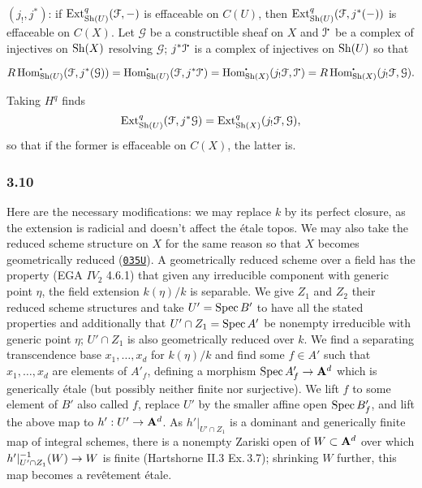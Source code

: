 \documentclass[deligne.tex]{subfiles}
\begin{document}
$(j_!,j^*)$: if $\operatorname{Ext}^q_{\operatorname{Sh}(U)}(\mathcal F,-)$ is effaceable on $C(U)$, 
then $\operatorname{Ext}^q_{\operatorname{Sh}(U)}(\mathcal F,j^*(-))$ is effaceable on $C(X)$.
Let $\mathcal G$ be a constructible sheaf on $X$ and $\mathcal I^\dotp$ be a 
complex of injectives on $\operatorname{Sh}(X)$ resolving $\mathcal G$;
$j^*\mathcal I^\dotp$ is a complex of injectives on $\operatorname{Sh}(U)$ so that
\begin{ceqn}\begin{equation*}
	R\Hom^\dotp_{\Sh(U)}(\mathcal F,j^*(\mathcal G))
	=\Hom^\dotp_{\Sh(U)}(\mathcal F,j^*\mathcal I^\dotp)
	=\Hom^\dotp_{\Sh(X)}(j_!\mathcal F,\mathcal I^\dotp)
	=R\Hom^\dotp_{\Sh(X)}(j_!\mathcal F,\mathcal G).
\end{equation*}\end{ceqn}
Taking $H^q$ finds
\begin{equation*}
	\operatorname{Ext}^q_{\operatorname{Sh}(U)}(\mathcal F,j^*\mathcal G)
	=\operatorname{Ext}^q_{\operatorname{Sh}(X)}(j_!\mathcal F,\mathcal G),
\end{equation*}
so that if the former is effaceable on $C(X)$, the latter is.



\subsubsection*{3.10} Here are the necessary modifications: we may replace
$k$ by its perfect closure, as the extension is radicial and doesn't affect
the étale topos. We may also take the reduced scheme structure on $X$ for 
the same reason so that $X$ becomes geometrically reduced
(\hyperref[https://stacks.math.columbia.edu/tag/035U]{\texttt{035U}}).
A geometrically reduced scheme over a field has the property
(EGA $IV_2$ 4.6.1) that given any irreducible component with generic point
$\eta$, the field extension $k(\eta)/k$ is separable.
We give $Z_1$ and $Z_2$ their reduced scheme structures and
take $U'=\operatorname{Spec} B'$ to have all the stated properties and additionally
that $U'\cap Z_1=\operatorname{Spec} A'$ be nonempty irreducible with generic point
$\eta$; $U'\cap Z_1$ is also geometrically reduced over $k$.
We find a separating transcendence base $x_1,\ldots,x_d$ for $k(\eta)/k$ and
find some $f\in A'$ such that $x_1,\ldots,x_d$ are elements of $A'_f$,
defining a morphism $\operatorname{Spec} A'_f\rightarrow\mathbf{A}^d$ which is generically étale
(but possibly neither finite nor surjective).
We lift $f$ to some element of $B'$ also called $f$, replace $U'$ by the
smaller affine open $\operatorname{Spec} B'_f$, and lift the above map to $h':U'\rightarrow\mathbf{A}^d$.
As $h'|_{U'\cap Z_1}$ is a dominant and generically finite map of integral
schemes, there is a nonempty Zariski open of $W\subset \mathbf{A}^d$ over which 
$h'|_{U'\cap Z_1}^{-1}(W)\rightarrow W$ is finite (Hartshorne II.3 Ex.\,3.7);
shrinking $W$ further, this map becomes a revêtement étale.
\end{document}
